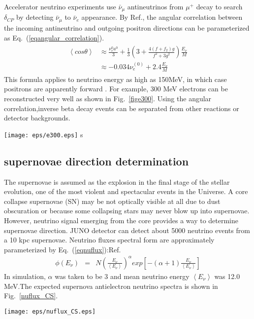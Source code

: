 \documentclass[a4paper,10pt]{cpc-hepnp}
\begin{document}
Accelerator neutrino experiments use $\bar{\nu}_{\mu}$ antineutrinos from $\mu^{+}$ decay  to search $\delta_{CP}$ by detecting
$\bar{\nu}_{\mu}$  to $\bar{\nu}_{e}$  appearance.
By Ref.\cite{angular_corrrelation}, the angular correlation between the incoming antineutrino and
outgoing positron directions can be parameterized  as Eq.~(\ref{eqangular_correlation}).
\begin{eqnarray}
\label{eqangular_correlation}
\begin{aligned}
\left<cos\theta\right>&\approx \frac{\nu^{0}_{e}a^{0}}{3}+\frac{1}{3}\left(3+\frac{4(f+f_{2})g}{f^{2}+3g^{2}}\right)\frac{E_{\nu}}{M}\\
&\approx -0.034\nu^{(0)}_{e} + 2.4\frac{E_{\nu}}{M}
\end{aligned}
\end{eqnarray}
This formula applies to neutrino energy as high as 150MeV, in which case positrons are apparently forward .
For example, 300 MeV electrons can be reconstructed very well as shown in Fig.~\ref{fige300}. Using the
angular correlation,inverse beta decay events can be separated from other reactions or detector backgrounds.
\begin{center}
\texttt{[image: eps/e300.eps]}
s
\end{center}
\subsection{supernovae direction determination }
The supernovae is assumed as the explosion in the final stage of the stellar evolution, one of the most violent and spectacular
events in the Universe. A core collapse supernovae (SN) may be not optically visible at all due to dust obscuration or because
some collapsing stars may never blow up into supernovae. However, neutrino signal emerging from the core provides a way to
determine supernovae direction. JUNO detector can detect about 5000 neutrino events from a 10 kpc supernovae.
Neutrino fluxes spectral form are approximately parameterized by Eq.~(\ref{eqnuflux}):Ref\cite{nuflux}.
\begin{eqnarray}
\label{eqnuflux}
\phi(E_{\nu}) &=& N\left(\frac{E_{\nu}}{ \left< E_{\nu}\right>}\right)^{\alpha}exp\left[ -(\alpha+1)\frac{E_{\nu}}{ \left< E_{\nu}\right>}\right]
\end{eqnarray}
In simulation, $\alpha$ was taken to be 3 and mean neutrino energy $\left< E_{\nu}\right>$ was 12.0 MeV.The expected supernova
antielectron neutrino spectra is shown in Fig.~\ref{nuflux_CS}.
\begin{center}
\texttt{[image: eps/nuflux\_CS.eps]}
\end{center}
\end{document}
